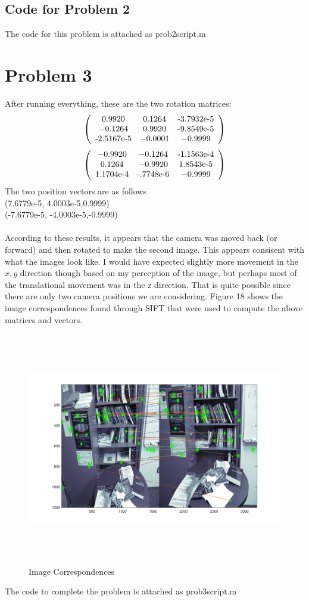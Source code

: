\documentclass[11pt,psfig]{article}
\begin{document}
\subsection*{Code for Problem 2}

The code for this problem is attached as prob2script.m

\newpage

\section*{Problem 3}

After running everything, these are the two rotation matrices:
\[ \left( \begin{array}{ccc}
0.9920 & 0.1264 & $-3.7932e-5$\\
-0.1264 &  0.9920 & $-9.8549e-5$\\		
$-2.5167e-5$ & -0.0001 & -0.9999 \end{array} \right)\] 
\[ \left( \begin{array}{ccc}
-0.9920 & -0.1264 & $-1.1563e-4$\\
0.1264 &  -0.9920 & $1.8543e-5$\\		
$1.1704e-4$ & $-.7748e-6$ & -0.9999 \end{array} \right)\] 
The two position vectors are as follows\\
(7.6779e-5, 4.0003e-5,0.9999)
\\
(-7.6779e-5, -4.0003e-5,-0.9999)
\\
\\
According to these results, it appears that the camera was moved back (or forward) and then rotated to make the second image. This appears consisent with what the images look like. I would have expected slightly more movement in the $x,y$ direction though based on my perception of the image, but perhaps most of the translational movement was in the z direction. That is quite possible since there are only two camera positions we are considering. Figure 18 shows the image correspondences found through SIFT that were used to compute the above matrices and vectors.

\begin{figure}[H]
\centering
\includegraphics[height=4in]{prob3matches.png}
\caption{Image Correspondences}
\label{p3}
\end{figure}
      
The code to complete the problem is attached as prob3script.m   
        
\end{document}
